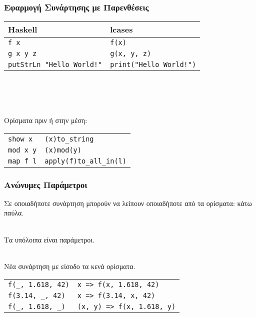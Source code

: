\documentclass{beamer}
\begin{document}
\begin{frame}[fragile]

\frametitle{Εφαρμογή Συνάρτησης με Παρενθέσεις}

\begin{otherlanguage}{english}

\begin{center}
\begin{tabular}{ |P{5cm}|P{5cm}| }
 \hline
 Haskell & lcases
 \\
 \hline
 \verb|f x| & \verb|f(x)|
 \\
 \verb|g x y z| & \verb|g(x, y, z)|
 \\
 \verb|putStrLn "Hello World!"| & \verb|print("Hello World!")|
 \\
 \hline
\end{tabular}
\\~\
\\~\
\end{center}

\end{otherlanguage}

\pause
Ορίσματα πριν ή στην μέση:
\begin{otherlanguage}{english}
\begin{center}
\begin{tabular}{ |P{5cm}|P{5cm}| }
 \hline
 \verb|show x| & \verb|(x)to_string|
 \\
 \verb|mod x y| & \verb|(x)mod(y)|
 \\
 \verb|map f l| & \verb|apply(f)to_all_in(l)|
 \\
 \hline
\end{tabular}
\end{center}
\end{otherlanguage}

\end{frame}

\begin{frame}[fragile]

\frametitle{Ανώνυμες Παράμετροι}

Σε οποιαδήποτε συνάρτηση μπορούν να λείπουν οποιαδήποτε από τα ορίσματα:
κάτω παύλα.
\\~\

Τα υπόλοιπα είναι παράμετροι.
\\~\

Νέα συνάρτηση με είσοδο τα κενά ορίσματα.

\pause
\begin{otherlanguage}{english}
\begin{center}
\begin{tabular}{ |P{5cm}|P{5cm}| }
 \hline
 \verb|f(_, 1.618, 42)| & \verb|x => f(x, 1.618, 42)|
 \\
 \verb|f(3.14, _, 42)| & \verb|x => f(3.14, x, 42)|
 \\
 \verb|f(_, 1.618, _)| & \verb|(x, y) => f(x, 1.618, y)|
 \\
 \hline
\end{tabular}
\end{center}
\end{otherlanguage}

\end{frame}
\end{document}
